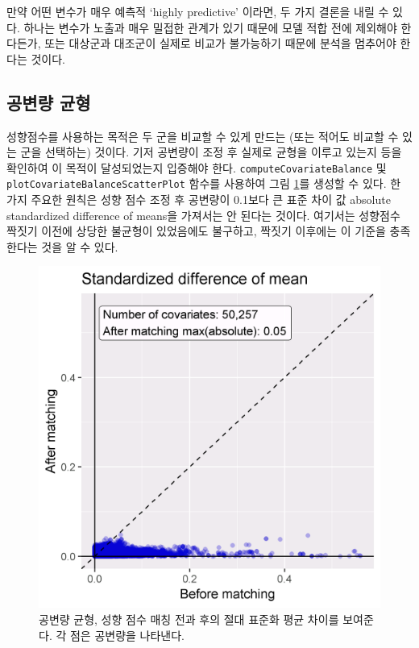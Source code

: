 \documentclass[10.5pt]{book}
\theoremstyle{definition}
\theoremstyle{definition}
\theoremstyle{definition}
\theoremstyle{remark}
\let\BeginKnitrBlock\begin \let\EndKnitrBlock\end
\begin{document}
\BeginKnitrBlock{rmdimportant}
만약 어떤 변수가 매우 예측적 `highly predictive' 이라면, 두 가지 결론을
내릴 수 있다. 하나는 변수가 노출과 매우 밀접한 관계가 있기 때문에 모델
적합 전에 제외해야 한다든가, 또는 대상군과 대조군이 실제로 비교가
불가능하기 때문에 분석을 멈추어야 한다는 것이다.
\EndKnitrBlock{rmdimportant}

\subsection{공변량 균형}\label{-}

성향점수를 사용하는 목적은 두 군을 비교할 수 있게 만드는 (또는 적어도
비교할 수 있는 군을 선택하는) 것이다. 기저 공변량이 조정 후 실제로
균형을 이루고 있는지 등을 확인하여 이 목적이 달성되었는지 입증해야 한다.
\texttt{computeCovariateBalance} 및
\texttt{plotCovariateBalanceScatterPlot} 함수를 사용하여 그림
\ref{fig:balance}를 생성할 수 있다. 한 가지 주요한 원칙은 성향 점수 조정
후 공변량이 0.1보다 큰 표준 차이 값 absolute standardized difference of
means을 가져서는 안 된다는 것이다. 여기서는 성향점수 짝짓기 이전에
상당한 불균형이 있었음에도 불구하고, 짝짓기 이후에는 이 기준을
충족한다는 것을 알 수 있다.

\begin{figure}

{\centering \includegraphics[width=0.7\linewidth]{images/PopulationLevelEstimation/balance} 

}

\caption{공변량 균형, 성향 점수 매칭 전과 후의 절대 표준화 평균 차이를 보여준다. 각 점은 공변량을 나타낸다.}\label{fig:balance}
\end{figure}
\end{document}
